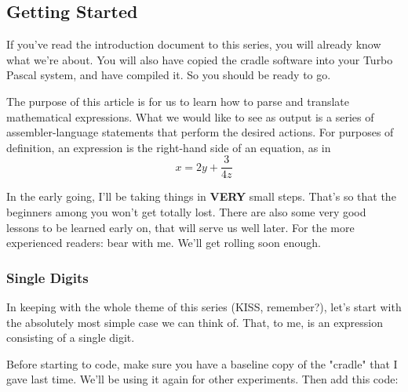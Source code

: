 \subsection{Getting Started}
If you've read the introduction document to this series, you will
already know what  we're  about.    You will also have copied the
cradle software  into your Turbo Pascal system, and have compiled
it.  So you should be ready to go.


The purpose of this article is for us to learn  how  to parse and
translate mathematical expressions.  What we would like to see as
output is a series of assembler-language statements  that perform
the desired actions.    For purposes of definition, an expression
is the right-hand side of an equation, as in
\[
	x = 2y + \frac{3}{4z}
\]

In the early going, I'll be taking things in \textbf{VERY}  small steps.
That's  so  that  the beginners among you won't get totally lost.
There are also  some  very  good  lessons to be learned early on,
that will serve us well later.  For the more experienced readers:
bear with me.  We'll get rolling soon enough.

\subsubsection{Single Digits}
In keeping with the whole theme of this series (KISS, remember?),
let's start with the absolutely most simple case we can think of.
That, to me, is an expression consisting of a single digit.

Before starting to code, make sure you have a  baseline  copy  of
the  "cradle" that I gave last time.  We'll be using it again for
other experiments.  Then add this code:

\begin{lstlisting}[language=C]

\end{lstlisting}